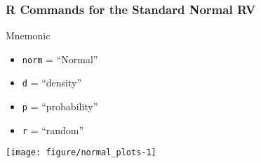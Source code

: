 \begin{frame}
  \frametitle{R Commands for the Standard Normal RV}

\begin{table}
\centering
{}
\end{table}

\begin{block}{Mnemonic}
  \begin{itemize}
    \item \texttt{norm} = ``Normal'' 
    \item \texttt{d} = ``density''
    \item \texttt{p} = ``probability'' 
    \item \texttt{r} = ``random''
  \end{itemize}
\end{block}

\end{frame}
\begin{frame}[fragile]
\begin{knitrout}
\color{fgcolor}\begin{kframe}
\begin{alltt}
\hlstd{(} \hlstd{=} \hlstd{(}\hlstd{,} \hlstd{))}
\hlstd{(} \hlopt{-}\hlstd{,} \hlstd{,}  \hlstd{=} \hlstd{)}
\hlstd{(} \hlopt{-}\hlstd{,} \hlstd{,}  \hlstd{=} \hlstd{)}
\end{alltt}
\end{kframe}
\texttt{[image: figure/normal\_plots-1]} 
\begin{kframe}\begin{alltt}
\hlstd{(} \hlstd{=} \hlstd{(}\hlstd{,} \hlstd{))}
\end{alltt}
\end{kframe}
\end{knitrout}
\end{frame}
